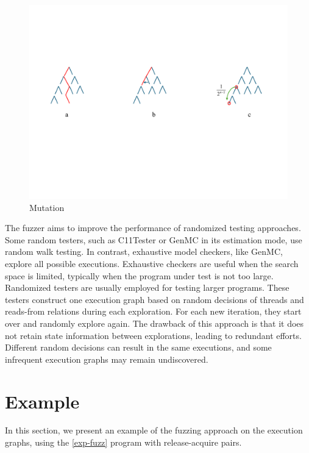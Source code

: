 \begin{figure}[h!tbp] %
    \centering
    \includegraphics[scale=0.5]{figure/tree3.pdf} %
    \caption{Mutation} %
    \label{tree3} %
\end{figure}



The fuzzer aims to improve the performance of randomized testing approaches. Some random testers, such as C11Tester or GenMC in its estimation mode, use random walk testing. In contrast, exhaustive model checkers, like GenMC, explore all possible executions. Exhaustive checkers are useful when the search space is limited, typically when the program under test is not too large. Randomized testers are usually employed for testing larger programs. These testers construct one execution graph based on random decisions of threads and reads-from relations during each exploration. For each new iteration, they start over and randomly explore again. The drawback of this approach is that it does not retain state information between explorations, leading to redundant efforts. Different random decisions can result in the same executions, and some infrequent execution graphs may remain undiscovered.

\section{Example}

In this section, we present an example of the fuzzing approach on the execution graphs, using the \ref{exp-fuzz} program with release-acquire pairs. 


